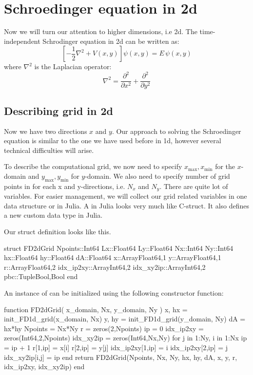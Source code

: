 \chapter{Schroedinger equation in 2d}

Now we will turn our attention to higher dimensions, i.e 2d.
The time-independent Schrodinger equation in 2d can be written as:
\begin{equation}
\left[ -\frac{1}{2}\nabla^2 + V(x,y) \right] \psi(x,y) = E\,\psi(x,y)
\label{eq:sch_2d}
\end{equation}
%
where $\nabla^2$ is the Laplacian operator:
%
\begin{equation}
\nabla^2 = \frac{\partial^2}{\partial x^2} + \frac{\partial^2}{\partial y^2}
\end{equation}



\section{Describing grid in 2d}

Now we have two directions $x$ and $y$. Our approach to solving the Schroedinger equation
is similar to the one we have used before in 1d, however several technical difficulties
will arise.

To describe the computational grid, we now need to specify
$x_{\mathrm{max}}, x_{\mathrm{min}}$ for the $x$-domain
and $y_{\mathrm{max}}, y_{\mathrm{min}}$ for $y$-domain. We also need to specify number of grid
points in for each x and y-directions, i.e. $N_{x}$ and $N_{y}$.
There are quite lot of variables.
For easier management, we will collect our grid related variables in one data structure or
 in Julia. A  in Julia looks very much like C-struct.
It also defines a new custom data type in Julia.

Our struct definition looks like this.
\begin{juliacode}
struct FD2dGrid
    Npoints::Int64
    Lx::Float64
    Ly::Float64
    Nx::Int64
    Ny::Int64
    hx::Float64
    hy::Float64
    dA::Float64
    x::Array{Float64,1}
    y::Array{Float64,1}
    r::Array{Float64,2}
    idx_ip2xy::Array{Int64,2}
    idx_xy2ip::Array{Int64,2}
    pbc::Tuple{Bool,Bool}
end
\end{juliacode}
%
An instance of  can be initialized using the following constructor function:
%
\begin{juliacode}
function FD2dGrid( x_domain, Nx, y_domain, Ny )
    x, hx = init_FD1d_grid(x_domain, Nx)
    y, hy = init_FD1d_grid(y_domain, Ny)
    dA = hx*hy
    Npoints = Nx*Ny
    r = zeros(2,Npoints)
    ip = 0
    idx_ip2xy = zeros(Int64,2,Npoints)
    idx_xy2ip = zeros(Int64,Nx,Ny)
    for j in 1:Ny, i in 1:Nx
        ip = ip + 1
        r[1,ip] = x[i]
        r[2,ip] = y[j]
        idx_ip2xy[1,ip] = i
        idx_ip2xy[2,ip] = j
        idx_xy2ip[i,j] = ip
    end
    return FD2dGrid(Npoints, Nx, Ny, hx, hy,
      dA, x, y, r, idx_ip2xy, idx_xy2ip)
end
\end{juliacode}

